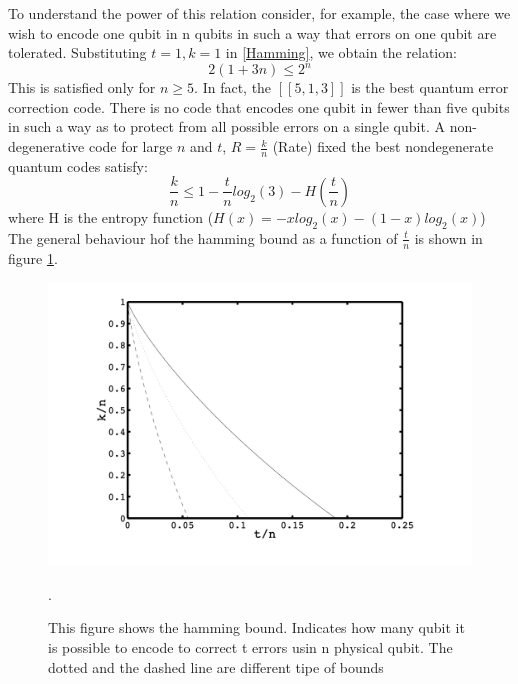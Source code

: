 To understand the power of this relation consider, for example, the case where we wish to encode one qubit in n qubits in such a way that errors on one qubit are tolerated.
Substituting $t=1,k=1$ in \ref{Hamming}, we obtain the relation: 
\begin{equation*}
    2(1+3n)\leq2^n
\end{equation*}
This is satisfied only for $n\geq 5$.
In fact, the $[[5,1,3]]$ is the best quantum error correction code. There is no code that encodes one qubit in fewer than five qubits in such a way as to protect from all possible errors on a single qubit.
A non-degenerative code for large $n$ and $t$, $R=\frac{k}{n}$ (Rate) fixed the best nondegenerate quantum codes satisfy: 
\begin{equation*}
    \frac{k}{n} \leq 1 - \frac{t}{n}log_2(3) - H\left(\frac{t}{n}\right)
\end{equation*}
where H is the entropy function ($H(x)=-xlog_2(x) -(1-x)log_2(x)$)
The general behaviour hof the hamming bound as a function of $\frac{t}{n}$ is shown in figure \ref{fig:hammingbound}.

\begin{figure}[h!]
    \centering
    \includegraphics[scale=0.7]{Mainmatter/images/hamming_bound.png}
    \caption{This figure shows the hamming bound. Indicates how many qubit it is possible to encode to correct t errors usin n physical qubit. The dotted and the dashed line are different tipe of bounds \cite{SteaneTut}}.
    \label{fig:hammingbound}
\end{figure}